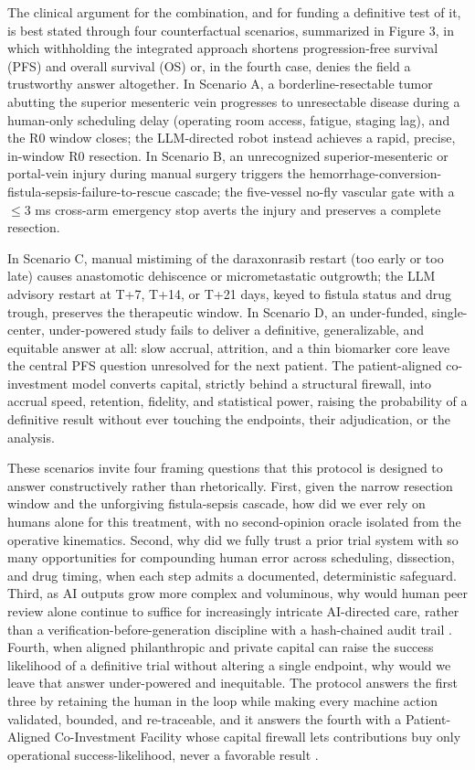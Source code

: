 The clinical argument for the combination, and for funding a definitive test of
it, is best stated through four counterfactual scenarios, summarized in Figure 3,
in which withholding the integrated approach shortens progression-free survival
(PFS) and overall survival (OS) or, in the fourth case, denies the field a
trustworthy answer altogether. In Scenario A, a borderline-resectable tumor
abutting the superior mesenteric vein progresses to unresectable disease during a
human-only scheduling delay (operating room access, fatigue, staging lag), and the
R0 window closes; the LLM-directed robot instead achieves a rapid, precise,
in-window R0 resection. In Scenario B, an unrecognized superior-mesenteric or
portal-vein injury during manual surgery triggers the
hemorrhage-conversion-fistula-sepsis-failure-to-rescue cascade; the five-vessel
no-fly vascular gate with a $\leq 3$ ms cross-arm emergency stop averts the injury
and preserves a complete resection. 

In Scenario C, manual mistiming of the
daraxonrasib restart (too early or too late) causes anastomotic dehiscence or
micrometastatic outgrowth; the LLM advisory restart at T+7, T+14, or T+21 days,
keyed to fistula status and drug trough, preserves the therapeutic window. In
Scenario D, an under-funded, single-center, under-powered study fails to deliver a
definitive, generalizable, and equitable answer at all: slow accrual, attrition,
and a thin biomarker core leave the central PFS question unresolved for the next
patient. The patient-aligned co-investment model converts capital, strictly behind
a structural firewall, into accrual speed, retention, fidelity, and statistical
power, raising the probability of a definitive result without ever touching the
endpoints, their adjudication, or the analysis.

These scenarios invite four framing questions that this protocol is designed to
answer constructively rather than rhetorically. First, given the narrow resection
window and the unforgiving fistula-sepsis cascade, how did we ever rely on humans
alone for this treatment, with no second-opinion oracle isolated from the
operative kinematics. Second, why did we fully trust a prior trial system with so
many opportunities for compounding human error across scheduling, dissection, and
drug timing, when each step admits a documented, deterministic safeguard. Third,
as AI outputs grow more complex and voluminous, why would human peer review alone
continue to suffice for increasingly intricate AI-directed care, rather than a
verification-before-generation discipline with a hash-chained audit trail
\cite{kawchak2026hr9510}. Fourth, when aligned philanthropic and private capital
can raise the success likelihood of a definitive trial without altering a single
endpoint, why would we leave that answer under-powered and inequitable. The
protocol answers the first three by retaining the human in the loop while making
every machine action validated, bounded, and re-traceable, and it answers the
fourth with a Patient-Aligned Co-Investment Facility whose capital firewall lets
contributions buy only operational success-likelihood, never a favorable result
\cite{kawchak2026hr9510}.

